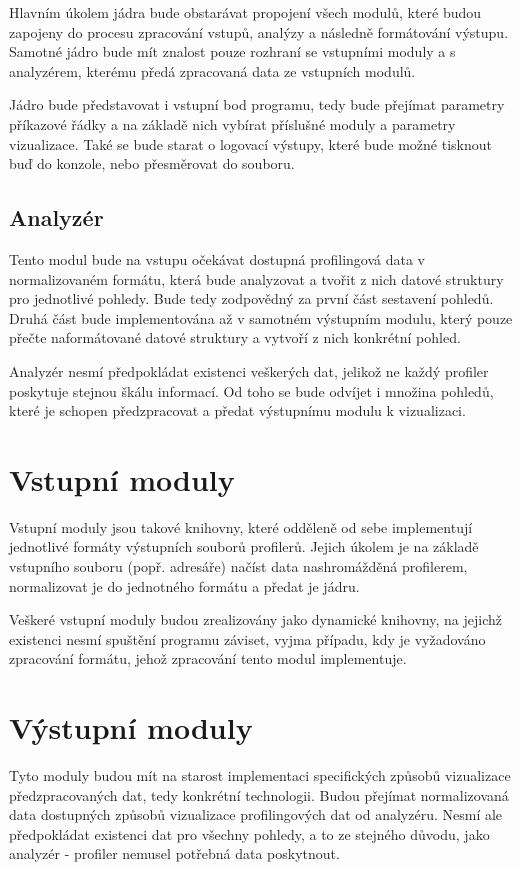 \documentclass[czech,BP]{thesiskiv}
\begin{document}
Hlavním úkolem jádra bude obstarávat propojení všech modulů, které budou zapojeny do procesu zpracování vstupů, analýzy a následně formátování výstupu. Samotné jádro bude mít znalost pouze rozhraní se vstupními moduly a s analyzérem, kterému předá zpracovaná data ze vstupních modulů.

Jádro bude představovat i vstupní bod programu, tedy bude přejímat parametry příkazové řádky a na základě nich vybírat příslušné moduly a parametry vizualizace. Také se bude starat o logovací výstupy, které bude možné tisknout buď do konzole, nebo přesměrovat do souboru.

\subsection{Analyzér}

Tento modul bude na vstupu očekávat dostupná profilingová data v normalizovaném formátu, která bude analyzovat a tvořit z nich datové struktury pro jednotlivé pohledy. Bude tedy zodpovědný za první část sestavení pohledů. Druhá část bude implementována až v samotném výstupním modulu, který pouze přečte naformátované datové struktury a vytvoří z nich konkrétní pohled.

Analyzér nesmí předpokládat existenci veškerých dat, jelikož ne každý profiler poskytuje stejnou škálu informací. Od toho se bude odvíjet i množina pohledů, které je schopen předzpracovat a předat výstupnímu modulu k vizualizaci.

\section{Vstupní moduly}

Vstupní moduly jsou takové knihovny, které odděleně od sebe implementují jednotlivé formáty výstupních souborů profilerů. Jejich úkolem je na základě vstupního souboru (popř. adresáře) načíst data nashromážděná profilerem, normalizovat je do jednotného formátu a předat je jádru. 

Veškeré vstupní moduly budou zrealizovány jako dynamické knihovny, na jejichž existenci nesmí spuštění programu záviset, vyjma případu, kdy je vyžadováno zpracování formátu, jehož zpracování tento modul implementuje.

\section{Výstupní moduly}

Tyto moduly budou mít na starost implementaci specifických způsobů vizualizace předzpracovaných dat, tedy konkrétní technologii. Budou přejímat normalizovaná data dostupných způsobů vizualizace profilingových dat od analyzéru. Nesmí ale předpokládat existenci dat pro všechny pohledy, a to ze stejného důvodu, jako analyzér - profiler nemusel potřebná data poskytnout.
\end{document}

